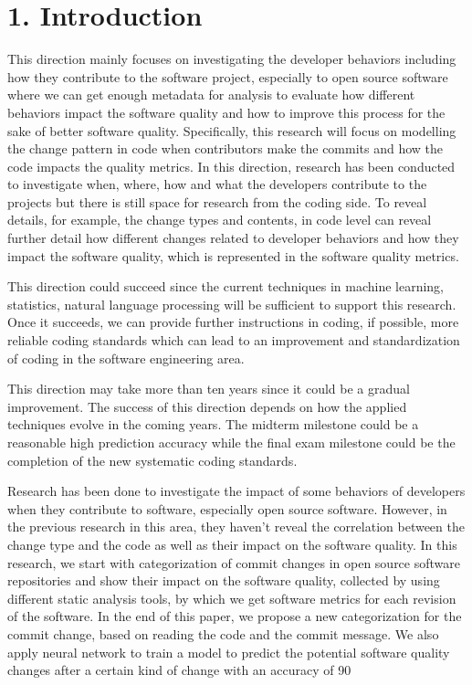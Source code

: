 \section*{1. Introduction}


This direction mainly focuses on investigating the developer behaviors including how they contribute to the software project, especially to open source software where we can get enough metadata for analysis to evaluate how different behaviors impact the software quality and how to improve this process for the sake of better software quality. Specifically, this research will focus on modelling the change pattern in code when contributors make the commits and how the code impacts the quality metrics. In this direction, research has been conducted to investigate when, where, how and what the developers contribute to the projects but there is still space for research from the coding side. To reveal details, for example, the change types and contents, in code level can reveal further detail how different changes related to developer behaviors and how they impact the software quality, which is represented in the software quality metrics.

This direction could succeed since the current techniques in machine learning, statistics, natural language processing will be sufficient to support this research. Once it succeeds, we can provide further instructions in coding, if possible, more reliable coding standards which can lead to an improvement and standardization of coding in the software engineering area.

This direction may take more than ten years since it could be a gradual improvement. The success of this direction depends on how the applied techniques evolve in the coming years. The midterm milestone could be a reasonable high prediction accuracy while the final exam milestone could be the completion of the new systematic coding standards.


Research has been done to investigate the impact of some behaviors of developers when they contribute to software, especially open source software. However, in the previous research in this area, they haven't reveal the correlation between the change type and the code as well as their impact on the software quality. In this research, we start with categorization of commit changes in open source software repositories and show their impact on the software quality, collected by using different static analysis tools, by which we get software metrics for each revision of the software. In the end of this paper, we propose a new categorization for the commit change, based on reading the code and the commit message. We also apply neural network to train a model to predict the potential software quality changes after a certain kind of change with an accuracy of 90%

